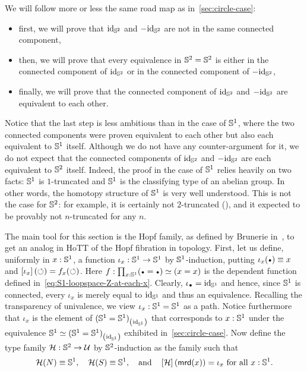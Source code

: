 \documentclass[english,a4]{article}
\renewcommand{\ap}[1]{\left[{#1}\right]}
\begin{document}
We will follow more or less the same road map as
in~\cref{sec:circle-case}:
\begin{itemize}
\item first, we will prove that $\mathord{\mathrm{id}}_{{\mathbb S^{2}}}$ and $-\mathord{\mathrm{id}}_{{\mathbb S^{2}}}$ are not in
  the same connected component,
\item then, we will prove that every equivalence in ${{\mathbb S^{2}}}={{\mathbb S^{2}}}$ is
  either in the connected component of $\mathord{\mathrm{id}}_{{\mathbb S^{2}}}$ or in the connected
  component of $-\mathord{\mathrm{id}}_{{\mathbb S^{2}}}$,
\item finally, we will prove that the connected component of $\mathord{\mathrm{id}}_{{\mathbb S^{2}}}$
  and $-\mathord{\mathrm{id}}_{{\mathbb S^{2}}}$ are equivalent to each other.
\end{itemize}
Notice that the last step is less ambitious than in the case of ${{\mathbb S^{1}}}$,
where the two connected components were proven equivalent to each
other but also each equivalent to ${{\mathbb S^{1}}}$ itself. Although we do not
have any counter-argument for it, we do not expect that the connected
components of $\mathord{\mathrm{id}}_{{\mathbb S^{2}}}$ and $-\mathord{\mathrm{id}}_{{\mathbb S^{2}}}$ are each equivalent to ${{\mathbb S^{2}}}$
itself. Indeed, the proof in the case of ${{\mathbb S^{1}}}$ relies heavily on two
facts: ${{\mathbb S^{1}}}$ is $1$-truncated and ${{\mathbb S^{1}}}$ is the classifying type of an
abelian group. In other words, the homotopy structure of ${{\mathbb S^{1}}}$ is very
well understood. This is not the case for ${{\mathbb S^{2}}}$: for example, it is
certainly not $2$-truncated (\cite{brunerie:thesis}), and it expected
to be provably not $n$-truncated for any $n$.

The main tool for this section is the Hopf family, as defined by Brunerie
in~\cite{brunerie:thesis}, to get an analog in HoTT of the Hopf
fibration in topology. First, let us define, uniformly in $x:{{\mathbb S^{1}}}$, a
function $\iota_x: {{\mathbb S^{1}}}\to{{\mathbb S^{1}}}$ by ${{\mathbb S^{1}}}$-induction, putting
$\iota_x(\base) \jdeq x$ and $\ap{\iota_x}(\Sloop) = f_x(\Sloop)$.
Here $f\from \prod_{x\from\Sc} (\base=\base) \weq (x=x)$ is the
dependent function defined in~\cref{eq:S1-loopspace-Z-at-each-x}.
Clearly, $\iota_{\base}=\id_{\Sc}$ and hence, since ${{\mathbb S^{1}}}$ is connected, 
every $\iota_x$ is merely equal to $\mathord{\mathrm{id}}_{{{\mathbb S^{1}}}}$ and thus an equivalence.
Recalling the transparency of univalence, 
we view $\iota_x: {{\mathbb S^{1}}}={{\mathbb S^{1}}}$ as a path.
Notice furthermore that $\iota_x$ is the element
of ${({{\mathbb S^{1}}}={{\mathbb S^{1}}})}_{\left(\mathord{\mathrm{id}}_{{\mathbb S^{1}}}\right)}$ that corresponds to $x:{{\mathbb S^{1}}}$
under the equivalence ${{\mathbb S^{1}}} \simeq {({{\mathbb S^{1}}}={{\mathbb S^{1}}})}_{\left(\mathord{\mathrm{id}}_{{\mathbb S^{1}}}\right)}$
exhibited in~\cref{sec:circle-case}. Now define the type family
${\mathcal H}: {{\mathbb S^{2}}} \to \mathcal{U}$ by ${{\mathbb S^{2}}}$-induction as the family such that
\begin{displaymath}
  \hopf(N) \jdeq \Sc,\quad
  \hopf(S) \jdeq \Sc,\quad\text{and}\quad
  \ap\hopf (\mrd(x)) = \iota_x\ \text{for all}\ x:\Sc.
\end{displaymath}
\end{document}
